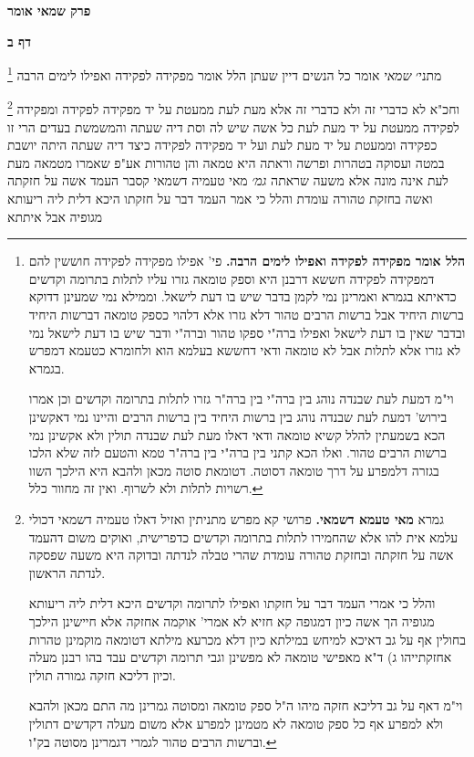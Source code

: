 \documentclass[12pt, openany]{book}
\newcommand{\sethebfont}{
\fontsize{10.5pt}{21.0pt} \selectfont
}
\newcommand{\twocol}[1]{
	{\sethebfont \begin{multicols}{2}
			#1
	\end{multicols}}	
}
\newcommand{\chapname}{}
\newcommand{\sectname}{}
\newcommand{\newchap}[1]{
	\addcontentsline{toc}{chapter}{#1}
	\renewcommand{\chapname}{#1}
		\begin{center}
			\textbf{%
\fontsize{16pt}{16pt}\selectfont
				#1}
		\end{center}
}
\newcommand{\newsection}[1]{
	\addcontentsline{toc}{section}{#1}
	\renewcommand{\sectname}{#1}	
	\vspace{-\baselineskip}
	\begin{center}
		\textbf{%
\fontsize{16pt}{16pt}\selectfont
			#1}
	\end{center}
	\vspace{-\baselineskip}
	\nopagebreak
}
\newcommand{\footnotecomment}[1]{
	\renewcommand\thefootnote{}
	\footnote{#1}}
\newcommand{\commenta}[1]{\footnotecomment{#1}}
\begin{document}
\newchap{פרק  שמאי אומר}
\newsection{דף ב}
\twocol{
\commenta{\textbf{הלל אומר מפקידה לפקידה ואפילו לימים הרבה.} פי' אפילו מפקידה לפקידה חוששין להם דמפקידה לפקידה חששא דרבנן היא וספק טומאה גזרו עליו לתלות בתרומה וקדשים כדאיתא בגמרא ואמרינן נמי לקמן בדבר שיש בו דעת לישאל. וממילא נמי שמעינן דדוקא ברשות היחיד אבל ברשות הרבים טהור דלא גזרו אלא דלהוי כספק טומאה דברשות היחיד ובדבר שאין בו דעת לישאל ואפילו ברה"י ספקו טהור וברה"י ודבר שיש בו דעת לישאל נמי לא גזרו אלא לתלות אבל לא טומאה ודאי דחששא בעלמא הוא ולחומרא כטעמא דמפרש בגמרא.\par וי"מ דמעת לעת שבנדה נוהג בין ברה"י בין ברה"ר גזרו לתלות בתרומה וקדשים וכן אמרו בירוש' דמעת לעת שבנדה נוהג בין ברשות היחיד בין ברשות הרבים והיינו נמי דאקשינן הכא בשמעתין להלל קשיא טומאה ודאי דאלו מעת לעת שבנדה תולין ולא אקשינן נמי ברשות הרבים טהור. ואלו הכא קתני בין ברה"י בין ברה"ר טמא והטעם לזה שלא הלכו בגזרה דלמפרע על דרך טומאה דסוטה. דטומאת סוטה מכאן ולהבא היא הילכך השוו רשויות לתלות ולא לשרוף. ואין זה מחוור כלל. }
מתני׳ {\large\emph{שמאי}} אומר כל הנשים דיין שעתן הלל אומר מפקידה לפקידה ואפילו לימים הרבה 
\commenta{גמרא \textbf{מאי טעמא דשמאי.} פרושי קא מפרש מתניתין ואזיל דאלו טעמיה דשמאי דכולי עלמא אית להו אלא שהחמירו לתלות בתרומה וקדשים כדפרישית, ואוקים משום דהעמד אשה על חזקתה ובחזקת טהורה עומדת שהרי טבלה לנדתה ובדוקה היא משעה שפסקה לנדתה הראשון.\par והלל כי אמרי העמד דבר על חזקתו ואפילו לתרומה וקדשים היכא דלית ליה ריעותא מגופיה הך אשה כיון דמגופה קא חזיא לא אמרי' אוקמה אחזקה אלא חיישינן הילכך בחולין אף על גב דאיכא למיחש במילתא כיון דלא מכרעא מילתא דטומאה מוקמינן טהרות אחזקתייהו ג) ד"א מאפישי טומאה לא מפשינן וגבי תרומה וקדשים עבד בהו רבנן מעלה וכיון דליכא חזקה גמורה תולין.\par וי"מ דאף על גב דליכא חזקה מיהו ה"ל ספק טומאה ומסוטה גמרינן מה התם מכאן ולהבא ולא למפרע אף כל ספק טומאה לא מטמינן למפרע אלא משום מעלה דקדשים דתולין וברשות הרבים טהור לגמרי דגמרינן מסוטה בק"ו. }
וחכ"א לא כדברי זה ולא כדברי זה אלא מעת לעת ממעטת על יד מפקידה לפקידה ומפקידה לפקידה ממעטת על יד מעת לעת 
כל אשה שיש לה וסת דיה שעתה והמשמשת בעדים הרי זו כפקידה וממעטת על יד מעת לעת ועל יד מפקידה לפקידה 
כיצד דיה שעתה היתה יושבת במטה ועסוקה בטהרות ופרשה וראתה היא טמאה והן טהורות 
אע"פ שאמרו מטמאה מעת לעת אינה מונה אלא משעה שראתה
{\large\emph{גמ׳}} מאי טעמיה דשמאי קסבר העמד אשה על חזקתה ואשה בחזקת טהורה עומדת והלל כי אמר העמד דבר על חזקתו היכא דלית ליה ריעותא מגופיה אבל איתתא}
\end{document}
